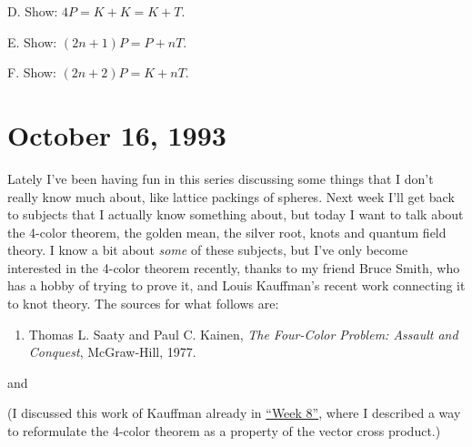 \documentclass{article}
\def\tightlist{}
\renewcommand{\texttt}[1]{%
  \begingroup
  \ttfamily
  \begingroup\lccode`~=`/\lowercase{\endgroup\def~}{/\discretionary{}{}{}}%
  \begingroup\lccode`~=`[\lowercase{\endgroup\def~}{[\discretionary{}{}{}}%
  \begingroup\lccode`~=`.\lowercase{\endgroup\def~}{.\discretionary{}{}{}}%
  \catcode`/=\active\catcode`[=\active\catcode`.=\active
  \scantokens{#1\noexpand}%
  \endgroup
}
\begin{document}
D. Show: \(4P = K + K = K + T\). 

E. Show: \((2n+1)P = P + nT\). 

F. Show: \((2n+2)P = K + nT\).



\hypertarget{week22}{%
\section{October 16, 1993}\label{week22}}

Lately I've been having fun in this series discussing some things that I
don't really know much about, like lattice packings of spheres. Next
week I'll get back to subjects that I actually know something about, but
today I want to talk about the 4-color theorem, the golden mean, the
silver root, knots and quantum field theory. I know a bit about
\emph{some} of these subjects, but I've only become interested in the
4-color theorem recently, thanks to my friend Bruce Smith, who has a
hobby of trying to prove it, and Louis Kauffman's recent work connecting
it to knot theory. The sources for what follows are:

\begin{enumerate}
\def\labelenumi{\arabic{enumi})}
\tightlist
\item
Thomas L. Saaty
  and Paul C. Kainen, 
  \emph{The Four-Color Problem: Assault and Conquest}, McGraw-Hill, 1977.
\end{enumerate}

and


(I discussed this work of Kauffman already in
\protect\hyperlink{week8}{``Week 8''}, where I described a way to
reformulate the 4-color theorem as a property of the vector cross
product.)
\end{document}
